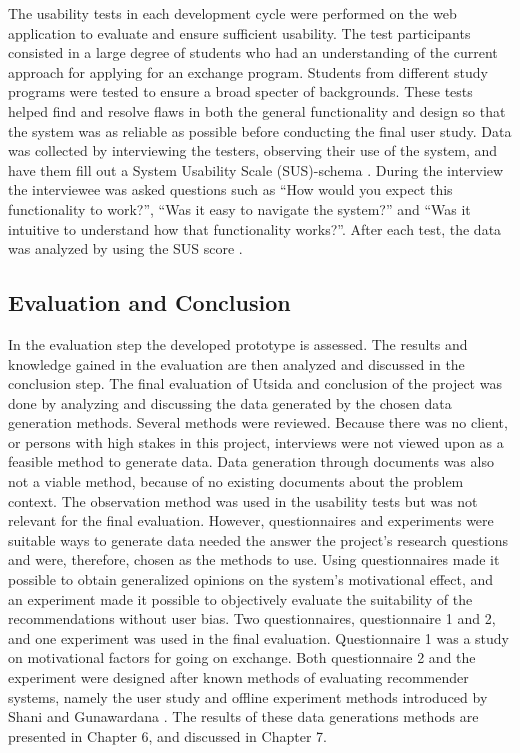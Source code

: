 The usability tests in each development cycle were performed on the web application to evaluate and ensure sufficient usability. The test participants consisted in a large degree of students who had an understanding of the current approach for applying for an exchange program. Students from different study programs were tested to ensure a broad specter of backgrounds. These tests helped find and resolve flaws in both the general functionality and design so that the system was as reliable as possible before conducting the final user study. Data was collected by interviewing the testers, observing their use of the system, and have them fill out a System Usability Scale (SUS)-schema \cite{brooke1996sus}. During the interview the interviewee was asked questions such as \enquote{How would you expect this functionality to work?}, \enquote{Was it easy to navigate the system?} and \enquote{Was it intuitive to understand how that functionality works?}. After each test, the data was analyzed by using the SUS score \cite{brooke1996sus}.

\subsection{Evaluation and Conclusion}

In the evaluation step the developed prototype is assessed. The results and knowledge gained in the evaluation are then analyzed and discussed in the conclusion step. The final evaluation of Utsida and conclusion of the project was done by analyzing and discussing the data generated by the chosen data generation methods. Several methods were reviewed. Because there was no client, or persons with high stakes in this project, interviews were not viewed upon as a feasible method to generate data. Data generation through documents was also not a viable method, because of no existing documents about the problem context. The observation method was used in the usability tests but was not relevant for the final evaluation. However, questionnaires and experiments were suitable ways to generate data needed the answer the project's research questions and were, therefore, chosen as the methods to use. Using questionnaires made it possible to obtain generalized opinions on the system's motivational effect, and an experiment made it possible to objectively evaluate the suitability of the recommendations without user bias. Two questionnaires, questionnaire 1 and 2, and one experiment was used in the final evaluation. Questionnaire 1 was a study on motivational factors for going on exchange. Both questionnaire 2 and the experiment were designed after known methods of evaluating recommender systems, namely the user study and offline experiment methods introduced by Shani and Gunawardana \cite{shani2011evaluating}. The results of these data generations methods are presented in Chapter 6, and discussed in Chapter 7. 

